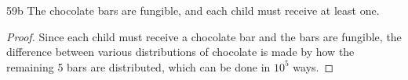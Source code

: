 \begin{exercise}{59b}
    The chocolate bars are fungible, and each child must receive at least one.
\end{exercise}
\begin{proof}
    Since each child must receive a chocolate bar and the bars are fungible, the difference between various distributions of chocolate is made by how the remaining 5 bars are distributed, which can be done in $10^5$ ways.
\end{proof}

